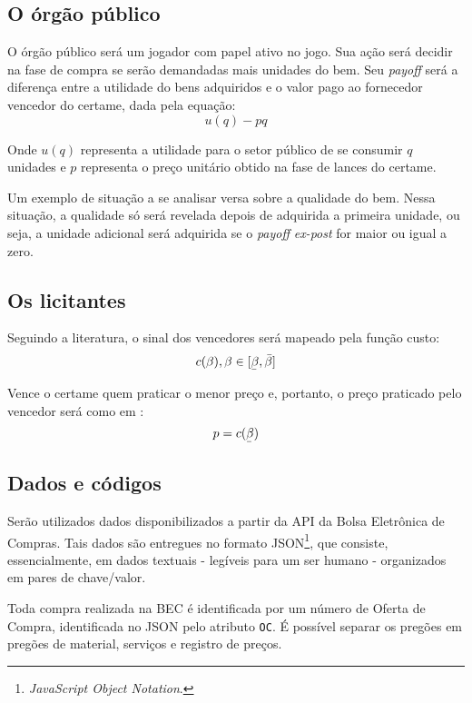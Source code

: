 \subsection{O órgão público}
O órgão público será um jogador com papel ativo no jogo. Sua ação será decidir na fase de compra se serão demandadas mais unidades do bem. Seu \emph{payoff} será a diferença entre a utilidade do bens adquiridos e o valor pago ao fornecedor vencedor do certame, dada pela equação:
\begin{equation}
    u(q) - pq
\end{equation}

Onde $u(q)$ representa a utilidade para o setor público de se consumir $q$ unidades e $p$ representa o preço unitário obtido na fase de lances do certame.

Um exemplo de situação a se analisar versa sobre a qualidade do bem. Nessa situação, a qualidade só será revelada depois de adquirida a primeira unidade, ou seja, a unidade adicional será adquirida se o \emph{payoff} \emph{ex-post} for maior ou igual a zero.

\subsection{Os licitantes}
Seguindo a literatura, o sinal dos vencedores será mapeado pela função custo:
\begin{equation}
    c(\beta), \beta \in [\underaccent{\bar}{\beta}, \bar{\beta}]
\end{equation}

Vence o certame quem praticar o menor preço e, portanto, o preço praticado pelo vencedor será como em \citep{barbosa2013}:
\begin{equation}
    p = c(\underaccent{\bar}{\beta})
\end{equation}

\subsection{Dados e códigos}
Serão utilizados dados disponibilizados a partir da API da Bolsa Eletrônica de Compras. Tais dados são entregues no formato JSON\footnote{\emph{JavaScript Object Notation}.}, que consiste, essencialmente, em dados textuais - legíveis para um ser humano - organizados em pares de chave/valor.

Toda compra realizada na BEC é identificada por um número de Oferta de Compra, identificada no JSON pelo atributo \verb+OC+. É possível separar os pregões em pregões de material, serviços e registro de preços.

